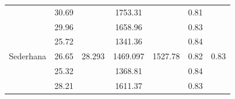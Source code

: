 \documentclass[conference]{IEEEtran}
\begin{document}
\begin{table}[]
\begin{tabular}{|l|cc|cc|cc|}
                                                      & \multicolumn{1}{c|}{\cellcolor[HTML]{FFFFFF}30.69} & \cellcolor[HTML]{FFFFFF}                         & \multicolumn{1}{c|}{\cellcolor[HTML]{FFFFFF}1753.31} & \cellcolor[HTML]{FFFFFF}                           & \multicolumn{1}{c|}{\cellcolor[HTML]{FFFFFF}0.81} & \cellcolor[HTML]{FFFFFF}                        \\ \cline{2-2} \cline{4-4} \cline{6-6}
                                                      & \multicolumn{1}{c|}{\cellcolor[HTML]{FFFFFF}29.96} & \cellcolor[HTML]{FFFFFF}                         & \multicolumn{1}{c|}{\cellcolor[HTML]{FFFFFF}1658.96} & \cellcolor[HTML]{FFFFFF}                           & \multicolumn{1}{c|}{\cellcolor[HTML]{FFFFFF}0.83} & \cellcolor[HTML]{FFFFFF}                        \\ \cline{2-2} \cline{4-4} \cline{6-6}
                                                      & \multicolumn{1}{c|}{\cellcolor[HTML]{FFFFFF}25.72} & \cellcolor[HTML]{FFFFFF}                         & \multicolumn{1}{c|}{\cellcolor[HTML]{FFFFFF}1341.36} & \cellcolor[HTML]{FFFFFF}                           & \multicolumn{1}{c|}{\cellcolor[HTML]{FFFFFF}0.84} & \cellcolor[HTML]{FFFFFF}                        \\ \cline{2-2} \cline{4-4} \cline{6-6}
  \multirow{-5}{*}{Sederhana}            & \multicolumn{1}{c|}{\cellcolor[HTML]{FFFFFF}26.65} & \multirow{-5}{*}{\cellcolor[HTML]{FFFFFF}28.293} & \multicolumn{1}{c|}{\cellcolor[HTML]{FFFFFF}1469.097} & \multirow{-5}{*}{\cellcolor[HTML]{FFFFFF}1527.78} & \multicolumn{1}{c|}{\cellcolor[HTML]{FFFFFF}0.82} & \multirow{-5}{*}{\cellcolor[HTML]{FFFFFF}0.83} \\ \hline
                                                      & \multicolumn{1}{c|}{\cellcolor[HTML]{FFFFFF}25.32} & \cellcolor[HTML]{FFFFFF}                         & \multicolumn{1}{c|}{\cellcolor[HTML]{FFFFFF}1368.81} & \cellcolor[HTML]{FFFFFF}                           & \multicolumn{1}{c|}{\cellcolor[HTML]{FFFFFF}0.84} & \cellcolor[HTML]{FFFFFF}                        \\ \cline{2-2} \cline{4-4} \cline{6-6}
                                                      & \multicolumn{1}{c|}{\cellcolor[HTML]{FFFFFF}28.21} & \cellcolor[HTML]{FFFFFF}                         & \multicolumn{1}{c|}{\cellcolor[HTML]{FFFFFF}1611.37} & \cellcolor[HTML]{FFFFFF}                           & \multicolumn{1}{c|}{\cellcolor[HTML]{FFFFFF}0.83} & \cellcolor[HTML]{FFFFFF}                        \\ \cline{2-2} \cline{4-4} \cline{6-6}

\end{tabular}
\end{table}
\end{document}
